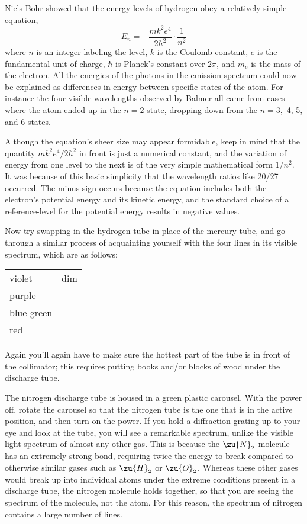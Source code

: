 Niels Bohr showed that the energy levels of hydrogen obey a relatively simple equation,\label{bohr-equation}
\begin{equation*}
	E_n = -\frac{mk^2e^4}{2\hbar^2}\cdot\frac{1}{n^2}
\end{equation*}
where $n$ is an integer labeling the level, $k$ is the
Coulomb constant, $e$ is the fundamental unit of charge, $\hbar$
is Planck's constant over $2\pi$, and $m_e$ is the mass of the electron.
All the energies of the photons in the emission spectrum
could now be explained as differences in energy between
specific states of the atom. For instance the four visible
wavelengths observed by Balmer all came from cases where the
atom ended up in the $n=2$ state, dropping down from the
$n=3,$ 4, 5, and 6 states.

Although the equation's sheer size may appear for\-mid\-ab\-le,
keep in mind that the quantity $mk^2e^4/2\hbar^2$ in front is just a
numerical constant, and the variation of energy from one
level to the next is of the very simple mathematical form
$1/n^2$. It was because of this basic simplicity that the
wavelength ratios like 20/27 occurred. The minus sign occurs
because the equation includes both the electron's potential
energy and its kinetic energy, and the standard choice of a
reference-level for the potential energy results in negative values. 

Now try swapping in the hydrogen tube in place of the mercury tube, and go through
a similar process of acquainting yourself with the four lines in its visible spectrum, which are as
follows:

\begin{tabular}{lp{50mm}}
  violet & dim \\
  purple & \\
  blue-green & \\
  red
\end{tabular}

Again you'll again have to make
sure the hottest part of the tube is in front of the
collimator; this requires putting
books and/or blocks of wood under the discharge tube.


The nitrogen discharge tube is housed in a green plastic
carousel. With the power off, rotate the carousel so that the nitrogen tube is
the one that is in the active position, and then turn on the power.
If you hold a diffraction grating up to your eye and look at the
tube, you will see a remarkable spectrum, unlike the visible light
spectrum of almost any other gas. This is because the $\zu{N}_2$ molecule has
an extremely strong bond, requiring twice the energy to break compared to
otherwise similar gases such as $\zu{H}_2$ or $\zu{O}_2$.
Whereas these other gases would break up into individual atoms under the extreme
conditions present in a discharge tube, the nitrogen molecule holds together, so
that you are seeing the spectrum of the molecule, not the atom.
For this reason, the spectrum of nitrogen contains a large number of lines.

